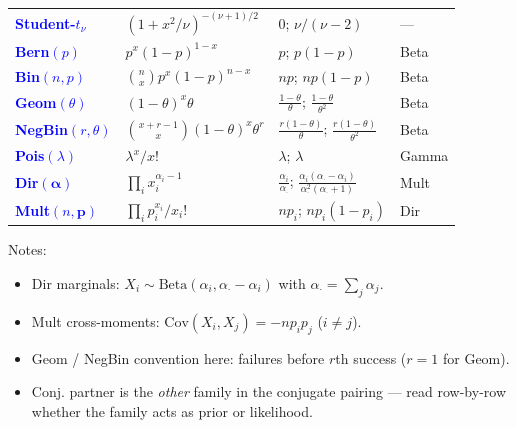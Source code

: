 {\begin{tabular}{@{}l l l l@{}}
\textcolor{Blue}{\textbf{Student-}$t_\nu$}         & $(1+x^2/\nu)^{-(\nu+1)/2}$             & $0$; $\nu/(\nu-2)$                                                     & --- \\
\addlinespace[1pt]
\textcolor{Blue}{\textbf{Bern}$(p)$}               & $p^x(1-p)^{1-x}$                        & $p$; $p(1-p)$                                                          & Beta \\
\textcolor{Blue}{\textbf{Bin}$(n,p)$}              & $\binom{n}{x}p^x(1-p)^{n-x}$           & $np$; $np(1-p)$                                                        & Beta \\
\textcolor{Blue}{\textbf{Geom}$(\theta)$}          & $(1-\theta)^x\theta$                    & $\tfrac{1-\theta}{\theta}$; $\tfrac{1-\theta}{\theta^2}$               & Beta \\
\textcolor{Blue}{\textbf{NegBin}$(r,\theta)$}      & $\binom{x+r-1}{x}(1-\theta)^x\theta^r$ & $\tfrac{r(1-\theta)}{\theta}$; $\tfrac{r(1-\theta)}{\theta^2}$         & Beta \\
\textcolor{Blue}{\textbf{Pois}$(\lambda)$}         & $\lambda^x/x!$                          & $\lambda$; $\lambda$                                                   & Gamma \\
\addlinespace[1pt]
\textcolor{Blue}{\textbf{Dir}$(\boldsymbol\alpha)$} & $\prod_i x_i^{\alpha_i-1}$             & $\tfrac{\alpha_i}{\alpha_\cdot}$; $\tfrac{\alpha_i(\alpha_\cdot-\alpha_i)}{\alpha_\cdot^2(\alpha_\cdot+1)}$ & Mult \\
\textcolor{Blue}{\textbf{Mult}$(n,\mathbf{p})$}    & $\prod_i p_i^{x_i}/x_i!$               & $np_i$; $np_i(1-p_i)$                                                  & Dir \\
\end{tabular}%
}
\footnotesize
\textcolor{Bittersweet}{Notes:}
\begin{itemize}
  \item Dir marginals: $X_i\sim\mathrm{Beta}(\alpha_i,\alpha_\cdot-\alpha_i)$ with $\alpha_\cdot=\sum_j\alpha_j$.
  \item Mult cross-moments: $\mathrm{Cov}(X_i,X_j)=-np_ip_j$ ($i\ne j$).
  \item Geom / NegBin convention here: failures before $r$th success ($r=1$ for Geom).
  \item Conj. partner is the \emph{other} family in the conjugate pairing --- read row-by-row whether the family acts as prior or likelihood.
\end{itemize}
